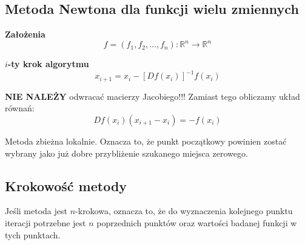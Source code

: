 \documentclass[../mn-notatki.tex]{subfiles}
\begin{document}
\subsection{Metoda Newtona dla funkcji wielu zmiennych}

\begin{tcolorbox}
\textbf{Założenia}
\[
f = (f_1, f_2, \ldots, f_n) : \mathbb{R}^n \rightarrow \mathbb{R}^n
\]

\textbf{$i$-ty krok algorytmu}
\[
x_{i+1} = x_i - \left[ D f(x_i) \right]^{-1} f(x_i)
\]

\textbf{NIE NALEŻY} odwracać macierzy Jacobiego!!!
Zamiast tego obliczamy układ równań:
\[
D f(x_i) (x_{i+1} - x_i) = -f(x_i)
\]
\end{tcolorbox}

Metoda zbieżna lokalnie. Oznacza to, że
punkt początkowy powinien zostać wybrany jako już dobre przybliżenie
szukanego miejsca zerowego.

\subsection{Krokowość metody}
\begin{tcolorbox}
Jeśli metoda jest  $n$-krokowa,
oznacza to, że do wyznaczenia kolejnego punktu iteracji potrzebne jest $n$
poprzednich punktów oraz wartości badanej funkcji w tych punktach.
\end{tcolorbox}

\pagebreak
\end{document}
